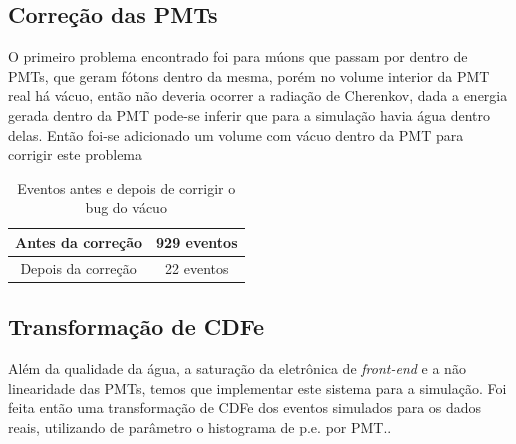 \subsection{Correção das PMTs}

O primeiro problema encontrado foi para múons que passam por dentro de PMTs, que geram fótons dentro da mesma, porém no volume interior da PMT real há vácuo, então não deveria ocorrer a radiação de Cherenkov, dada a energia gerada dentro da PMT pode-se inferir que para a simulação havia água dentro delas. Então foi-se adicionado um volume com vácuo dentro da PMT para corrigir este problema

\begin{table}[H]
	\centering
	\begin{tabular}{|c|c|}
		\hline
		Antes da correção  & 929 eventos \\ \hline
		Depois da correção & 22  eventos \\ \hline
	\end{tabular}

\caption{Eventos antes e depois de corrigir o bug do vácuo}
\end{table}


\subsection{Transformação de CDFe}

Além da qualidade da água, a saturação da eletrônica de \emph{front-end} e a não linearidade das PMTs, temos que implementar este sistema para a simulação. Foi feita então uma transformação de \ac{CDFe} dos eventos simulados para os dados reais, utilizando de parâmetro o histograma de p.e. por PMT.. 


